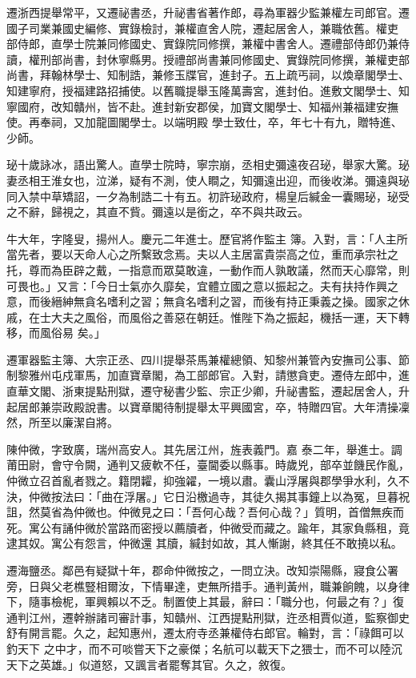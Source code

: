 \begin{pinyinscope}
 遷浙西提舉常平，又遷祕書丞，升祕書省著作郎，尋為軍器少監兼權左司郎官。遷國子司業兼國史編修、實錄檢討，兼權直舍人院，遷起居舍人，兼職依舊。權吏
 部侍郎，直學士院兼同修國史、實錄院同修撰，兼權中書舍人。遷禮部侍郎仍兼侍讀，權刑部尚書，封休寧縣男。授禮部尚書兼同修國史、實錄院同修撰，兼權吏部尚書，拜翰林學士、知制誥，兼修玉牒官，進封子。五上疏丐祠，以煥章閣學士、知建寧府，授福建路招捕使。以舊職提舉玉隆萬壽宮，進封伯。進敷文閣學士、知寧國府，改知贛州，皆不赴。進封新安郡侯，加寶文閣學士、知福州兼福建安撫使。再奉祠，又加龍圖閣學士。以端明殿
 學士致仕，卒，年七十有九，贈特進、少師。



 珌十歲詠冰，語出驚人。直學士院時，寧宗崩，丞相史彌遠夜召珌，舉家大驚。珌妻丞相王淮女也，泣涕，疑有不測，使人瞷之，知彌遠出迎，而後收涕。彌遠與珌同入禁中草矯詔，一夕為制誥二十有五。初許珌政府，楊皇后緘金一囊賜珌，珌受之不辭，歸視之，其直不貲。彌遠以是銜之，卒不與共政云。



 牛大年，字隆叟，揚州人。慶元二年進士。歷官將作監主
 簿。入對，言：「人主所當先者，要以天命人心之所繫致念焉。夫以人主居富貴崇高之位，重而承宗社之托，尊而為臣辟之戴，一指意而眾莫敢違，一動作而人孰敢議，然而天心靡常，則可畏也。」又言：「今日士氣亦久靡矣，宜體立國之意以振起之。夫有扶持作興之意，而後縉紳無貪名嗜利之習；無貪名嗜利之習，而後有持正秉義之操。國家之休戚，在士大夫之風俗，而風俗之善惡在朝廷。惟陛下為之振起，機括一運，天下轉移，而風俗易
 矣。」



 遷軍器監主簿、大宗正丞、四川提舉茶馬兼權總領、知黎州兼管內安撫司公事、節制黎雅州屯戍軍馬，加直寶章閣，為工部郎官。入對，請懲貪吏。遷侍左郎中，進直華文閣、浙東提點刑獄，遷守秘書少監、宗正少卿，升祕書監，遷起居舍人，升起居郎兼崇政殿說書。以寶章閣待制提舉太平興國宮，卒，特贈四官。大年清操凜然，所至以廉潔自將。



 陳仲微，字致廣，瑞州高安人。其先居江州，旌表義門。嘉
 泰二年，舉進士。調莆田尉，會守令闕，通判又疲軟不任，臺閫委以縣事。時歲兇，部卒並饑民作亂，仲微立召首亂者戮之。籍閉糶，抑強糴，一境以肅。囊山浮屠與郡學爭水利，久不決，仲微按法曰：「曲在浮屠。」它日沿檄過寺，其徒久揭其事鐘上以為冤，旦暮祝詛，然莫省為仲微也。仲微見之曰：「吾何心哉？吾何心哉？」質明，首僧無疾而死。寓公有誦仲微於當路而密授以薦牘者，仲微受而藏之。踰年，其家負縣租，竟逮其奴。寓公有怨言，仲微還
 其牘，緘封如故，其人慚謝，終其任不敢撓以私。



 遷海鹽丞。鄰邑有疑獄十年，郡命仲微按之，一問立決。改知崇陽縣，寢食公署旁，日與父老樵豎相爾汝，下情畢達，吏無所措手。通判黃州，職兼餉餽，以身律下，隨事檢柅，軍興賴以不乏。制置使上其最，辭曰：「職分也，何最之有？」復通判江州，遷幹辦諸司審計事，知贛州、江西提點刑獄，迕丞相賈似道，監察御史舒有開言罷。久之，起知惠州，遷太府寺丞兼權侍右郎官。輪對，言：「祿餌可以釣天下
 之中才，而不可啖嘗天下之豪傑；名航可以載天下之猥士，而不可以陸沉天下之英雄。」似道怒，又諷言者罷奪其官。久之，敘復。




\end{pinyinscope}
